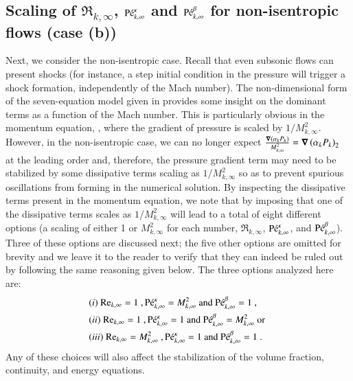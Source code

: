 \documentclass[preprint,10pt]{elsarticle}
\begin{document}
\subsection{Scaling of $\Re_{k,\infty}$, $\textrm{P\'e}_{k,\infty}^\kappa$ and $\textrm{P\'e}_{k,\infty}^\beta$ for non-isentropic flows (case (b))}\label{eq:non_isent_flows}
%
Next, we consider the non-isentropic case. Recall that even subsonic flows can present shocks (for instance, 
a step initial condition in the pressure will trigger a shock formation, independently of the Mach number). 
The non-dimensional form of the seven-equation model given in  provides some insight on the 
dominant terms as a function of the Mach number. This is particularly obvious in the momentum equation, , 
where the gradient of pressure is scaled by $1/M_{k,\infty}^2$. However, in the non-isentropic case, we can no longer 
expect $\frac{\boldsymbol\nabla \left( \alpha_k P_k \right)}{M_{k,\infty}^2}=\boldsymbol\nabla \left( \alpha_k P_k \right)_2$ at the leading order and, 
therefore, the pressure gradient term may need to be stabilized by 
some dissipative terms scaling as $1/M_{k,\infty}^2$ so as to prevent spurious oscillations from forming in the numerical solution. 
By inspecting the dissipative terms present in the momentum equation, we note that by imposing that one of the dissipative terms 
scales as $1/M_{k,\infty}^2$ will lead to a total of eight different options (a scaling of either 1 or $M^2_{k,\infty}$ for each number, 
$\Re_{k,\infty}$, $\textrm{P\'e}_{k,\infty}^\kappa$, and $\textrm{P\'e}_{k,\infty}^\beta$). Three of these options are discussed next; the five other 
options are omitted for brevity and we leave it to the reader to verify that they can indeed be ruled out by following the same reasoning given below. 
The three options analyzed here are:
%
\begin{align}
&(i) \ \textrm{Re}_{k,\infty} = 1 \ , \textrm{P\'e}_{k,\infty}^\kappa = M_{k,\infty}^2 \text{ and } \textrm{P\'e}_{k,\infty}^\beta = 1 \ , \nonumber \\
&(ii) \ \textrm{Re}_{k,\infty} = 1 \ , \textrm{P\'e}_{k,\infty}^\kappa = 1 \text{ and } \textrm{P\'e}_{k,\infty}^\beta = M_{k,\infty}^2 \text{ or } \nonumber \\
&(iii) \ \textrm{Re}_{k,\infty} = M_{k,\infty}^2 \ , \textrm{P\'e}_{k,\infty}^\kappa = 1 \text{ and } \textrm{P\'e}_{k,\infty}^\beta = 1 \ . \nonumber
\end{align}
%
Any of these choices will also affect the stabilization of the volume fraction, continuity, and energy equations. 
\end{document}
